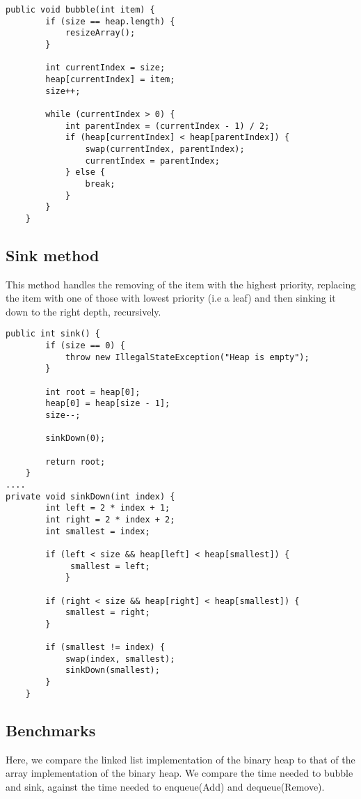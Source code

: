 \documentclass[a4paper,11pt]{article}
\begin{document}
\begin{verbatim}
public void bubble(int item) {
        if (size == heap.length) {
            resizeArray();
        }
        
        int currentIndex = size;
        heap[currentIndex] = item;
        size++;
        
        while (currentIndex > 0) {
            int parentIndex = (currentIndex - 1) / 2;
            if (heap[currentIndex] < heap[parentIndex]) {
                swap(currentIndex, parentIndex);
                currentIndex = parentIndex;
            } else {
                break;
            }
        }
    }
\end{verbatim}

\subsection*{Sink method}
 This method handles the removing of the item with the highest priority, replacing the item with one of those with lowest priority (i.e a leaf) and then sinking it down to the right depth, recursively.
 
 \begin{verbatim}
public int sink() {
        if (size == 0) {
            throw new IllegalStateException("Heap is empty");
        }
        
        int root = heap[0];
        heap[0] = heap[size - 1];
        size--;
        
        sinkDown(0);
        
        return root;
    }
....
private void sinkDown(int index) {
        int left = 2 * index + 1;
        int right = 2 * index + 2;
        int smallest = index;

        if (left < size && heap[left] < heap[smallest]) {
             smallest = left;
            }
        
        if (right < size && heap[right] < heap[smallest]) {
            smallest = right;
        }
        
        if (smallest != index) {
            swap(index, smallest);
            sinkDown(smallest);
        }
    }
\end{verbatim}


\subsection*{Benchmarks}
Here, we compare the linked list implementation of the binary heap to that of the array implementation of the binary heap. We compare the time needed to bubble and sink, against the time needed to enqueue(Add) and dequeue(Remove).
\end{document}
